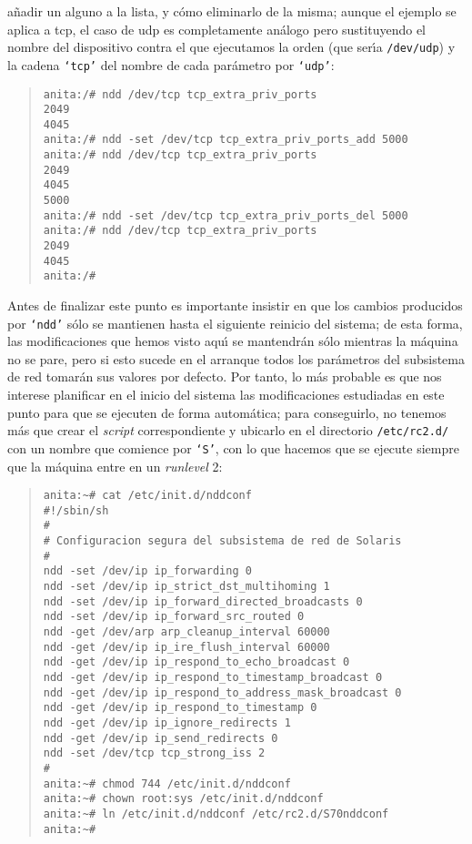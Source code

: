a\~nadir un alguno a la lista, y c\'omo eliminarlo de la misma; aunque el 
ejemplo se aplica a {\sc tcp}, el caso de {\sc udp} es completamente an\'alogo 
pero sustituyendo el nombre del dispositivo contra el que ejecutamos la orden 
(que ser\'{\i}a {\tt /dev/udp}) y la cadena {\tt `tcp'} del nombre de cada 
par\'ametro por {\tt `udp'}:
\begin{quote}
\begin{verbatim}
anita:/# ndd /dev/tcp tcp_extra_priv_ports
2049
4045
anita:/# ndd -set /dev/tcp tcp_extra_priv_ports_add 5000
anita:/# ndd /dev/tcp tcp_extra_priv_ports
2049
4045
5000
anita:/# ndd -set /dev/tcp tcp_extra_priv_ports_del 5000
anita:/# ndd /dev/tcp tcp_extra_priv_ports
2049
4045
anita:/#
\end{verbatim}
\end{quote}
Antes de finalizar este punto es importante insistir en que los cambios 
producidos 
por {\tt `ndd'} s\'olo se mantienen hasta el siguiente reinicio del sistema; 
de esta forma, las modificaciones que hemos visto aqu\'{\i} se mantendr\'an 
s\'olo mientras la m\'aquina no se pare, pero si esto sucede en el arranque 
todos los par\'ametros del subsistema de red tomar\'an sus valores por defecto.
Por tanto, lo m\'as probable es que nos interese planificar en el inicio del
sistema las modificaciones estudiadas en este punto para que se ejecuten de
forma autom\'atica; para conseguirlo, no tenemos m\'as que crear el {\it 
script} correspondiente y ubicarlo en el directorio {\tt /etc/rc2.d/} con un
nombre que comience por {\tt `S'}, con lo que hacemos que se ejecute siempre que
la m\'aquina entre en un {\it runlevel} 2:
\begin{quote}
\begin{verbatim}
anita:~# cat /etc/init.d/nddconf
#!/sbin/sh
#
# Configuracion segura del subsistema de red de Solaris
#
ndd -set /dev/ip ip_forwarding 0
ndd -set /dev/ip ip_strict_dst_multihoming 1
ndd -set /dev/ip ip_forward_directed_broadcasts 0
ndd -set /dev/ip ip_forward_src_routed 0
ndd -get /dev/arp arp_cleanup_interval 60000
ndd -get /dev/ip ip_ire_flush_interval 60000
ndd -get /dev/ip ip_respond_to_echo_broadcast 0
ndd -get /dev/ip ip_respond_to_timestamp_broadcast 0
ndd -get /dev/ip ip_respond_to_address_mask_broadcast 0
ndd -get /dev/ip ip_respond_to_timestamp 0
ndd -get /dev/ip ip_ignore_redirects 1
ndd -get /dev/ip ip_send_redirects 0
ndd -set /dev/tcp tcp_strong_iss 2
#
anita:~# chmod 744 /etc/init.d/nddconf
anita:~# chown root:sys /etc/init.d/nddconf
anita:~# ln /etc/init.d/nddconf /etc/rc2.d/S70nddconf
anita:~# 
\end{verbatim}
\end{quote}
